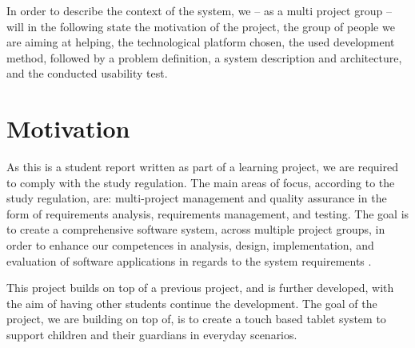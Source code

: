 In order to describe the context of the system, we -- as a multi project group -- will in the following state the motivation of the project, the group of people we are aiming at helping, the technological platform chosen, the used development method, followed by a problem definition, a system description and architecture, and the conducted usability test.

\section{Motivation}
As this is a student report written as part of a learning project, we are required to comply with the study regulation.
The main areas of focus, according to the study regulation, are: multi-project management and quality assurance in the form of requirements analysis, requirements management, and testing.
The goal is to create a comprehensive software system, across multiple project groups, in order to enhance our competences in analysis, design, implementation, and evaluation of software applications in regards to the system requirements \cite{studyreg}.

This project builds on top of a previous project, and is further developed, with the aim of having other students continue the development.
The goal of the project, we are building on top of, is to create a touch based tablet system to support children and their guardians in everyday scenarios.